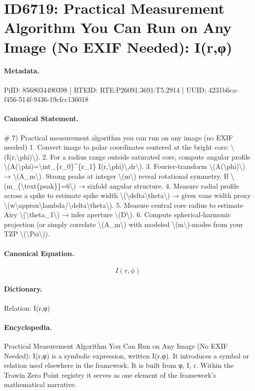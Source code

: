 \section*{ID6719: Practical Measurement Algorithm You Can Run on Any Image (No EXIF Needed): I(r,φ)}
\paragraph{Metadata.}
PiID: 8568034490398 | RTEID: RTE:P26091.3691:T5.2914 | UUID: 4231b6ca-f456-514f-9436-19cfcc136018

\paragraph{Canonical Statement.}
\# 7) Practical measurement algorithm you can run on any image (no EXIF needed) 1. Convert image to polar coordinates centered at the bright core: \textbackslash{}(I(r,\textbackslash{}phi)\textbackslash{}). 2. For a radius range outside saturated core, compute angular profile \textbackslash{}(A(\textbackslash{}phi)=\textbackslash{}int\_\{r\_0\}\textasciicircum{}\{r\_1\} I(r,\textbackslash{}phi)\textbackslash{},dr\textbackslash{}). 3. Fourier-transform \textbackslash{}(A(\textbackslash{}phi)\textbackslash{}) → \textbackslash{}(A\_m\textbackslash{}). Strong peaks at integer \textbackslash{}(m\textbackslash{}) reveal rotational symmetry. If \textbackslash{}(m\_\{\textbackslash{}text\{peak\}\}=6\textbackslash{}) → sixfold angular structure. 4. Measure radial profile across a spike to estimate spike width \textbackslash{}(\textbackslash{}delta\textbackslash{}theta\textbackslash{}) → gives vane width proxy \textbackslash{}(w\textbackslash{}approx\textbackslash{}lambda/\textbackslash{}delta\textbackslash{}theta\textbackslash{}). 5. Measure central core radius to estimate Airy \textbackslash{}(\textbackslash{}theta\_1\textbackslash{}) → infer aperture \textbackslash{}(D\textbackslash{}). 6. Compute spherical-harmonic projection (or simply correlate \textbackslash{}(A\_m\textbackslash{}) with modeled \textbackslash{}(m\textbackslash{})-modes from your TZP \textbackslash{}(\textbackslash{}Psi\textbackslash{})).

\paragraph{Canonical Equation.}
\[
I(r,\phi)
\]

\paragraph{Dictionary.}
Relation: I(r,φ)

\paragraph{Encyclopedia.}
Practical Measurement Algorithm You Can Run on Any Image (No EXIF Needed): I(r,φ) is a symbolic expression, written I(r,φ). It introduces a symbol or relation used elsewhere in the framework. It is built from φ, I, r. Within the Trawin Zero Point registry it serves as one element of the framework's mathematical narrative.
